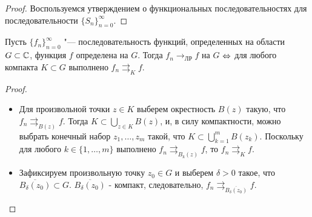 \begin{proof}
	Воспользуемся утверждением о функциональных последовательностях для последовательности $\{S_n\}_{n=0}^\infty$.
\end{proof}

\begin{proposition}
	Пусть $\{f_n\}_{n = 0}^\infty$ "--- последовательность функций, определенных на области $G \subset \mathbb{C}$, функция $f$ определена на $G$. Тогда $f_n \rightarrow_{\text{ЛР}} f$ на $G$ $\Leftrightarrow$ для любого компакта $K \subset G$ выполнено $f_n \rightrightarrows_K f$.
\end{proposition}

\begin{proof}~
	\begin{itemize}
		\item[$\ra$]Для произвольной точки $z \in K$ выберем окрестность $B(z)$ такую, что $f_n \rightrightarrows_{B(z)} f$. Тогда $K \subset \bigcup_{z \in K}B(z)$, и, в силу компактности, можно выбрать конечный набор $z_1, \dotsc, z_m$ такой, что $K \subset \bigcup_{k=1}^mB(z_k)$. Поскольку для любого $k \in \{1, \dotsc, m\}$ выполнено $f_n \rightrightarrows_{B_k(z)} f$, то $f_n \rightrightarrows_K f$.
		
		\item[$\la$]Зафиксируем произвольную точку $z_0 \in G$ и выберем $\delta > 0$ такое, что $\overline{B_\delta(z_0)} \subset G$. $\overline{B_\delta(z_0)}$ - компакт, следовательно, $f_n \rightrightarrows_{\overline{B_\delta(z_0)}} f$.\qedhere
	\end{itemize}
\end{proof}

